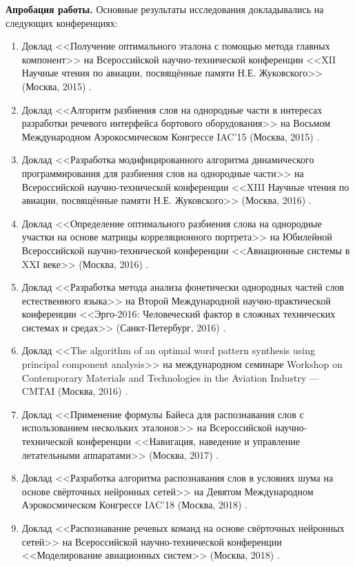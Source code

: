 \textbf{Апробация работы.}
Основные результаты исследования докладывались на следующих конференциях:
\begin{enumerate}[label={\arabic*)}]
	\item Доклад <<Получение оптимального эталона с помощью метода главных компонент>> на Всероссийской научно-технической конференции <<XII Научные чтения по авиации, посвящённые памяти Н.Е. Жуковского>> (Москва, 2015) \cite{poliyev2015pca}.
	\item Доклад <<Алгоритм разбиения слов на однородные части в интересах разработки речевого интерфейса бортового оборудования>> на Восьмом Международном Аэрокосмическом Конгрессе IAC'15 (Москва, 2015) \cite{poliyev2015split}.
	\item Доклад <<Разработка модифицированного алгоритма динамического программирования для разбиения слов на однородные части>> на Всероссийской научно-технической конференции <<XIII Научные чтения по авиации, посвящённые памяти Н.Е. Жуковского>> (Москва, 2016) \cite{poliyev2016dynamic}.
	\item Доклад <<Определение оптимального разбиения слова на однородные участки на основе матрицы корреляционного портрета>> на Юбилейной Всероссийской научно-технической конференции <<Авиационные системы в XXI веке>> (Москва, 2016) \cite{poliyev2016split, poliyev2017split}.
	\item Доклад <<Разработка метода анализа фонетически однородных частей слов естественного языка>> на Второй Международной научно-практической конференции <<Эрго-2016: Человеческий фактор в сложных технических системах и средах>> (Санкт-Петербург, 2016) \cite{poliyev2016natural}.
	\item Доклад <<The algorithm of an optimal word pattern synthesis using principal component analysis>> на международном семинаре Workshop on Contemporary Materials and Technologies in the Aviation Industry --- CMTAI (Москва, 2016) \cite{poliyev2016pca}.
	\item Доклад <<Применение формулы Байеса для распознавания слов с использованием нескольких эталонов>> на Всероссийской научно-технической конференции <<Навигация, наведение и управление летательными аппаратами>> (Москва, 2017) \cite{poliyev2017bayes}.
	\item Доклад <<Разработка алгоритма распознавания слов в условиях шума на основе свёрточных нейронных сетей>> на Девятом Международном Аэрокосмическом Конгрессе IAC'18 (Москва, 2018) \cite{poliyev2018cnn}.
	\item Доклад <<Распознавание речевых команд на основе свёрточных нейронных сетей>> на Всероссийской научно-технической конференции <<Моделирование авиационных систем>> (Москва, 2018) \cite{poliyev2018cnn2}.
\end{enumerate}

